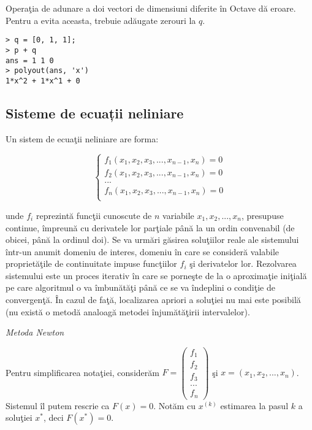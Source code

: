 \documentclass{exam}
\begin{document}
Operaţia de adunare a doi vectori de dimensiuni diferite în Octave dă eroare. Pentru a evita aceasta, trebuie adăugate zerouri la $q$.
\begin{verbatim}
> q = [0, 1, 1]; 
> p + q 
ans = 1 1 0 
> polyout(ans, 'x') 
1*x^2 + 1*x^1 + 0
\end{verbatim}

\subsection{Sisteme de ecuații neliniare}
Un sistem de ecuaţii neliniare are forma:

$$\left\{
	\begin{array}{lll}
		f_{1}(x_{1},x_{2},x_{3},...,x_{n-1},x_{n})=0 \\
		f_{2}(x_{1},x_{2},x_{3},...,x_{n-1},x_{n})=0 \\
		...                                          \\
		f_{n}(x_{1},x_{2},x_{3},...,x_{n-1},x_{n})=0 \\
	\end{array}
	\right.$$

\noindent  unde $f_{i}$ reprezintă funcţii cunoscute de $n$ variabile $x_{1}, x_{2}, ..., x_{n}$, presupuse continue, împreună cu derivatele lor parţiale până la un ordin convenabil (de obicei, până la ordinul doi). Se va urmări găsirea soluţiilor reale ale sistemului într-un anumit domeniu de interes, domeniu în care se consideră valabile proprietăţile de continuitate impuse funcţiilor $f_{i}$ şi derivatelor lor. Rezolvarea sistemului este un proces iterativ în care se porneşte de la o aproximaţie iniţială pe care algoritmul o va îmbunătăţi până ce se va îndeplini o condiţie de convergenţă. În cazul de faţă, localizarea apriori a soluţiei nu mai este posibilă (nu există o metodă analoagă metodei înjumătăţirii intervalelor).

\textit{Metoda Newton}

Pentru simplificarea notaţiei, considerăm $F=\left(\begin{array}{c}f_{1}\\f_{2}\\f_{3}\\...\\f_{n} \end{array}\right)$ şi $x=(x_{1},x_{2},...,x_{n})$. Sistemul îl putem rescrie ca $F(x)=0$.
Notăm cu $x^{(k)}$ estimarea la pasul $k$ a soluţiei $x^{*}$, deci $F(x^{*})=0$.
\end{document}
